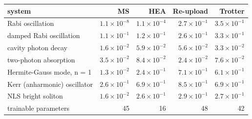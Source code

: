 \begin{tabular}{lrrrr}
\toprule
system & MS & HEA & Re-upload & Trotter \\
\midrule
Rabi oscillation & {\boldmath $1.1\times10^{-8}$} & $1.1\times10^{-4}$ & $2.7\times10^{-1}$ & $3.5\times10^{-1}$ \\
damped Rabi oscillation & {\boldmath $1.1\times10^{-1}$} & $1.2\times10^{-1}$ & $2.6\times10^{-1}$ & $3.3\times10^{-1}$ \\
cavity photon decay & {\boldmath $1.6\times10^{-2}$} & $5.9\times10^{-2}$ & $5.6\times10^{-2}$ & $3.3\times10^{-2}$ \\
two-photon absorption & $3.5\times10^{-2}$ & $8.4\times10^{-2}$ & {\boldmath $2.4\times10^{-2}$} & $7.6\times10^{-2}$ \\
Hermite-Gauss mode, n = 1 & {\boldmath $1.3\times10^{-2}$} & $2.4\times10^{-1}$ & $7.1\times10^{-1}$ & $6.1\times10^{-1}$ \\
Kerr (anharmonic) oscillator & {\boldmath $2.6\times10^{-1}$} & $6.9\times10^{-1}$ & $8.5\times10^{-1}$ & $6.9\times10^{-1}$ \\
NLS bright soliton & {\boldmath $1.6\times10^{-2}$} & $2.6\times10^{-1}$ & $2.9\times10^{-1}$ & $2.7\times10^{-1}$ \\
\midrule
trainable parameters & 45 & 16 & 48 & 42 \\
\bottomrule
\end{tabular}
